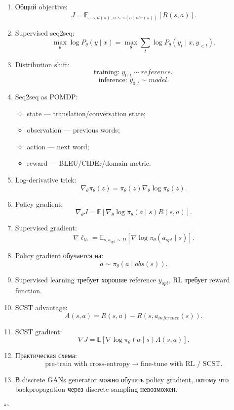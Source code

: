\documentclass[a4paper,12pt]{article}
\begin{document}
\begin{enumerate}
    \item Общий objective:
    \[
    J
    =
    \mathbb{E}_{s\sim d(s),\,a\sim\pi(a\mid obs(s))}
    [
    R(s,a)
    ].
    \]

    \item Supervised seq2seq:
    \[
    \max_\theta \log P_\theta(y\mid x)
    =
    \max_\theta
    \sum_t
    \log P_\theta(y_t\mid x,y_{<t}).
    \]

    \item Distribution shift:
    \[
    \text{training: } y_{0:t}\sim reference,
    \]
    \[
    \text{inference: } \hat{y}_{0:t}\sim model.
    \]

    \item Seq2seq as POMDP:
    \begin{itemize}
        \item state --- translation/conversation state;
        \item observation --- previous words;
        \item action --- next word;
        \item reward --- BLEU/CIDEr/domain metric.
    \end{itemize}

    \item Log-derivative trick:
    \[
    \nabla_\theta \pi_\theta(z)
    =
    \pi_\theta(z)
    \nabla_\theta \log \pi_\theta(z).
    \]

    \item Policy gradient:
    \[
    \nabla_\theta J
    =
    \mathbb{E}
    [
    \nabla_\theta
    \log \pi_\theta(a\mid s)
    R(s,a)
    ].
    \]

    \item Supervised gradient:
    \[
    \nabla \ell_{lh}
    =
    \mathbb{E}_{s,a_{opt}\sim D}
    [
    \nabla \log \pi_\theta(a_{opt}\mid s)
    ].
    \]

    \item Policy gradient обучается на:
    \[
    a\sim\pi_\theta(a\mid obs(s)).
    \]

    \item Supervised learning требует хорошие reference \(y_{opt}\), RL требует reward function.

    \item SCST advantage:
    \[
    A(s,a)
    =
    R(s,a)
    -
    R(s,a_{inference}(s)).
    \]

    \item SCST gradient:
    \[
    \nabla J
    =
    \mathbb{E}
    [
    \nabla \log \pi_\theta(a\mid s)
    A(s,a)
    ].
    \]

    \item Практическая схема:
    \[
    \text{pre-train with cross-entropy}
    \rightarrow
    \text{fine-tune with RL / SCST}.
    \]

    \item В discrete GANs generator можно обучать policy gradient, потому что backpropagation через discrete sampling невозможен.
\end{enumerate}
```





\end{document}
